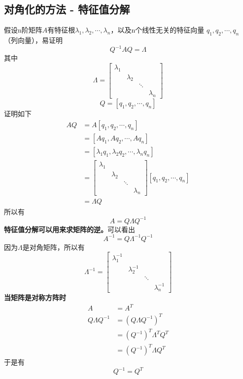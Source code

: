 \documentclass[]{article}
\begin{document}
\subsection{对角化的方法 - 特征值分解}
假设n阶矩阵$ A $有特征根$\lambda_1,  \lambda_2, \cdots, \lambda_n$，以及n个线性无关的特征向量 $ q_1, q_2, \cdots, q_n $（列向量），易证明
\[ 
Q^{-1}AQ = \Lambda
 \]
其中
\[ 
\Lambda =
\begin{bmatrix}
\lambda_1 & & & \\
& \lambda_2 & & \\
& & \ddots & \\
& & & \lambda_n
\end{bmatrix}
 \]
\[ 
Q = [q_1, q_2, \cdots, q_n]
 \]
证明如下
\[ 
\begin{aligned}
AQ &= A[q_1, q_2, \cdots, q_n] \\
   &= [Aq_1, Aq_2, \cdots, Aq_n] \\
   &= [\lambda_1 q_1, \lambda_2 q_2, \cdots, \lambda_n q_n] \\
   &= 
   \begin{bmatrix}
   \lambda_1 & & & \\
   & \lambda_2 & & \\
   & & \ddots & \\
   & & & \lambda_n
   \end{bmatrix}   
   [q_1, q_2, \cdots, q_n] \\
   &= \Lambda Q
\end{aligned}
 \]
所以有
\[ 
A = Q\Lambda Q^{-1}
 \]
\textbf{特征值分解可以用来求矩阵的逆。}可以看出
\[ 
A^{-1} = Q\Lambda^{-1}Q^{-1}
 \]
因为$ \Lambda $是对角矩阵，所以有
\[ 
\Lambda^{-1} =
\begin{bmatrix}
\lambda_1^{-1} & & & \\
& \lambda_2^{-1} & & \\
& & \ddots & \\
& & & \lambda_n^{-1}
\end{bmatrix}
\]
\textbf{当矩阵是对称方阵时}
\[ 
\begin{aligned}
A &= A^T \\
Q\Lambda Q^{-1} &= (Q\Lambda Q^{-1})^T \\
                &= (Q^{-1})^T\Lambda^T Q^T \\
                &= (Q^{-1})^T\Lambda Q^T
\end{aligned}
 \]
于是有
\[ 
Q^{-1} = Q^T
 \]
\end{document}
